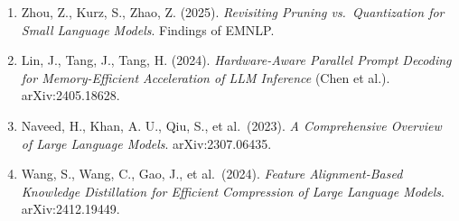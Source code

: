 \begin{enumerate}
\item
  Zhou, Z., Kurz, S., Zhao, Z. (2025). \emph{Revisiting Pruning vs.~Quantization for Small Language Models}. Findings of EMNLP.
\item
  Lin, J., Tang, J., Tang, H. (2024). \emph{Hardware-Aware Parallel Prompt Decoding for Memory-Efficient Acceleration of LLM Inference} (Chen et al.). arXiv:2405.18628.
\item
  Naveed, H., Khan, A. U., Qiu, S., et al.~(2023). \emph{A Comprehensive Overview of Large Language Models}. arXiv:2307.06435.
\item
  Wang, S., Wang, C., Gao, J., et al.~(2024). \emph{Feature Alignment-Based Knowledge Distillation for Efficient Compression of Large Language Models}. arXiv:2412.19449.
\end{enumerate}
